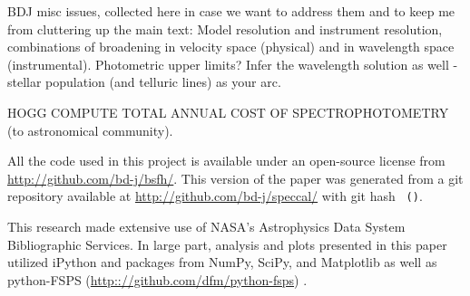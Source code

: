 \documentclass[iop,numberedappendix]{emulateapj}
\begin{document}
{\color{blue} BDJ misc issues, collected here in case we want to
address them and to keep me from cluttering up the main text:} Model
resolution and instrument resolution, combinations of broadening in
velocity space (physical) and in wavelength space (instrumental).
Photometric upper limits? Infer the wavelength solution as well -
stellar population (and telluric lines) as your arc.

HOGG COMPUTE TOTAL ANNUAL COST OF SPECTROPHOTOMETRY (to astronomical community).

All the code used in this project is available under an open-source license
  from \url{http://github.com/bd-j/bsfh/}.
This version of the paper was generated
  from a git repository available at \url{http://github.com/bd-j/speccal/}
  with git hash \texttt{\githash\,(\gitdate)}.

\acknowledgements
This research made extensive use of NASA's Astrophysics Data System Bibliographic Services. 
In large part, analysis and plots presented in this paper utilized
  iPython and packages from NumPy, SciPy, and Matplotlib
  \citep[][]{hunter2007, oliphant2007, perez2007} as well
  as python-FSPS  (\url{http:://github.com/dfm/python-fsps}) .
\end{document}
